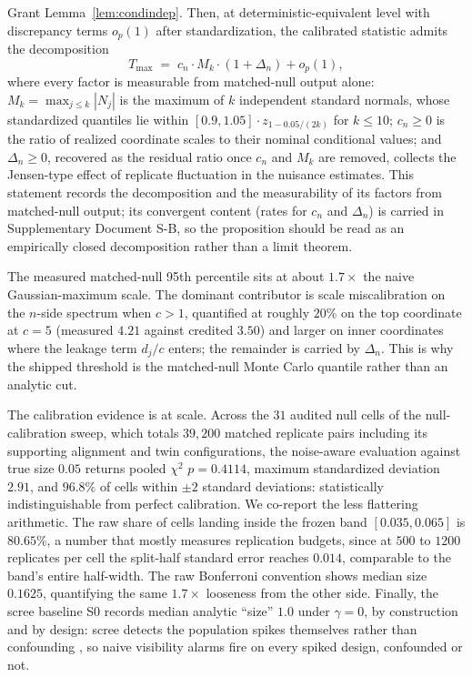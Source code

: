 \begin{remark}
\label{prop:nullfactor}
Grant Lemma~\ref{lem:condindep}. Then, at deterministic-equivalent level with discrepancy terms $o_p(1)$ after standardization, the calibrated statistic admits the decomposition
\[
T_{\max}\;=\;c_n\cdot M_k\cdot(1+\Delta_n)+o_p(1),
\]
where every factor is measurable from matched-null output alone: $M_k=\max_{j\le k}|N_j|$ is the maximum of $k$ independent standard normals, whose standardized quantiles lie within $[0.9,1.05]\cdot z_{1-0.05/(2k)}$ for $k\le10$; $c_n\ge0$ is the ratio of realized coordinate scales to their nominal conditional values; and $\Delta_n\ge0$, recovered as the residual ratio once $c_n$ and $M_k$ are removed, collects the Jensen-type effect of replicate fluctuation in the nuisance estimates. This statement records the decomposition and the measurability of its factors from matched-null output; its convergent content (rates for $c_n$ and $\Delta_n$) is carried in Supplementary Document S-B, so the proposition should be read as an empirically closed decomposition rather than a limit theorem.
\end{remark}

The measured matched-null 95th percentile sits at about $1.7\times$ the naive Gaussian-maximum scale. The dominant contributor is scale miscalibration on the $n$-side spectrum when $c>1$, quantified at roughly $20\%$ on the top coordinate at $c=5$ (measured $4.21$ against credited $3.50$) and larger on inner coordinates where the leakage term $d_j/c$ enters; the remainder is carried by $\Delta_n$. This is why the shipped threshold is the matched-null Monte Carlo quantile rather than an analytic cut.

The calibration evidence is at scale. Across the $31$ audited null cells of the null-calibration sweep, which totals $39{,}200$ matched replicate pairs including its supporting alignment and twin configurations, the noise-aware evaluation against true size $0.05$ returns pooled $\chi^2$ $p=0.4114$, maximum standardized deviation $2.91$, and $96.8\%$ of cells within $\pm 2$ standard deviations: statistically indistinguishable from perfect calibration. We co-report the less flattering arithmetic. The raw share of cells landing inside the frozen band $[0.035,0.065]$ is $80.65\%$, a number that mostly measures replication budgets, since at $500$ to $1200$ replicates per cell the split-half standard error reaches $0.014$, comparable to the band's entire half-width. The raw Bonferroni convention shows median size $0.1625$, quantifying the same $1.7\times$ looseness from the other side. Finally, the scree baseline S0 records median analytic ``size'' $1.0$ under $\gamma=0$, by construction and by design: scree detects the population spikes themselves rather than confounding \citep{johnstone2001distribution}, so naive visibility alarms fire on every spiked design, confounded or not.

